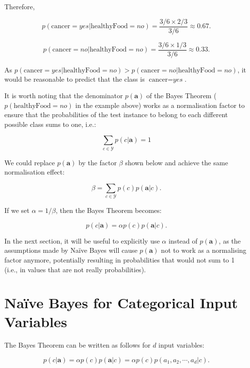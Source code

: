 \vspace{1cm}
Therefore,

\[p(\text{cancer}=\textit{yes}|\text{healthyFood} = \textit{no}) = \frac{3/6 \times 2/3}{3/6} \approx 0.67.\]

\[p(\text{cancer}=\textit{no}|\text{healthyFood} = \textit{no}) = \frac{3/6 \times 1/3}{3/6} \approx 0.33.\]

As $p(\text{cancer}=\textit{yes}|\text{healthyFood} = \textit{no}) > p(\text{cancer}=\textit{no}|\text{healthyFood} = \textit{no})$, it would be reasonable to predict that the class is $\text{cancer} = \textit{yes}$.


It is worth noting that the denominator $p(\mathbf{a})$ of the Bayes Theorem ($p(\text{healthyFood} = \textit{no})$ in the example above) works as a normalisation factor to ensure that the probabilities of the test instance to belong to each different possible class sums to one, i.e.:

\[ \sum_{c \in \mathcal{Y}} p(c|\mathbf{a}) = 1\]


We could replace $p(\mathbf{a})$ by the factor $\beta$ shown below and achieve the same normalisation effect:

\[ \beta = \sum_{c \in \mathcal{Y}} p(c) p(\mathbf{a}|c) . \]

If we set $\alpha = 1 / \beta$, then the Bayes Theorem becomes:

\begin{equation}p(c|\mathbf{a}) = \alpha p(c) p(\mathbf{a}|c) . \label{eq:nb-alpha}\end{equation}

In the next section, it will be useful to explicitly use $\alpha$ instead of $p(\mathbf{a})$, as the assumptions made by Na\"{i}ve Bayes will cause $p(\mathbf{a})$ not to work as a normalising factor anymore, potentially resulting in probabilities that would not sum to 1 (i.e., in values that are not really probabilities).

\section{Na\"{i}ve Bayes for Categorical Input Variables}
\label{sec:nb-categorical}

The Bayes Theorem can be written as follows for $d$ input variables:

\[p(c|\mathbf{a}) = \alpha p(c) p(\mathbf{a}|c)  = \alpha p(c) p(a_1,a_2,\cdots,a_d|c).\]

